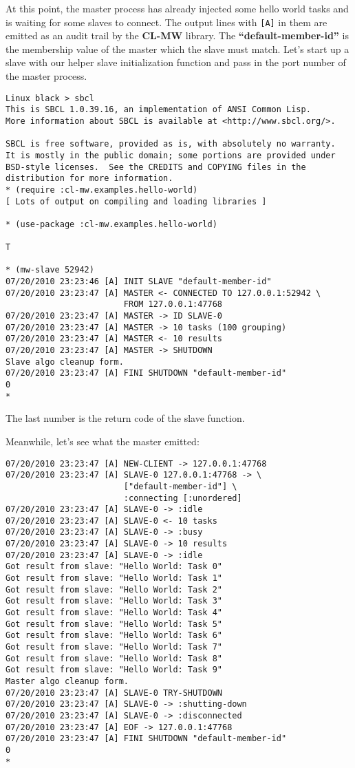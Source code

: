 \documentclass[titlepage,12pt]{book}
\newcommand{\xsmall}{\latexhtml{\small}{}}
\newcommand{\xnormalsize}{\latexhtml{\normalsize}{}}
\newcommand{\clmw}{\xsmall\textbf{CL-MW}\xnormalsize\xspace}
\newcommand{\bold}[1]{\textbf{#1}\xspace}
\begin{document}
At this point, the master process has already injected some hello
world tasks and is waiting for some slaves to connect. The output
lines with \texttt{[A]} in them are emitted as an audit trail by the
\clmw library.  The \bold{``default-member-id''} is the membership
value of the master which the slave must match. Let's start up a slave
with our helper slave initialization function and pass in the port
number of the master process.

\small
\begin{verbatim}
Linux black > sbcl
This is SBCL 1.0.39.16, an implementation of ANSI Common Lisp.
More information about SBCL is available at <http://www.sbcl.org/>.

SBCL is free software, provided as is, with absolutely no warranty.
It is mostly in the public domain; some portions are provided under
BSD-style licenses.  See the CREDITS and COPYING files in the
distribution for more information.
* (require :cl-mw.examples.hello-world)
[ Lots of output on compiling and loading libraries ]

* (use-package :cl-mw.examples.hello-world)

T

* (mw-slave 52942)
07/20/2010 23:23:46 [A] INIT SLAVE "default-member-id"
07/20/2010 23:23:47 [A] MASTER <- CONNECTED TO 127.0.0.1:52942 \
                        FROM 127.0.0.1:47768
07/20/2010 23:23:47 [A] MASTER -> ID SLAVE-0
07/20/2010 23:23:47 [A] MASTER -> 10 tasks (100 grouping)
07/20/2010 23:23:47 [A] MASTER <- 10 results
07/20/2010 23:23:47 [A] MASTER -> SHUTDOWN
Slave algo cleanup form.
07/20/2010 23:23:47 [A] FINI SHUTDOWN "default-member-id"
0
* 
\end{verbatim}
\normalsize

The last number is the return code of the slave function.

Meanwhile, let's see what the master emitted:

\small
\begin{verbatim}
07/20/2010 23:23:47 [A] NEW-CLIENT -> 127.0.0.1:47768
07/20/2010 23:23:47 [A] SLAVE-0 127.0.0.1:47768 -> \
                        ["default-member-id"] \
                        :connecting [:unordered]
07/20/2010 23:23:47 [A] SLAVE-0 -> :idle
07/20/2010 23:23:47 [A] SLAVE-0 <- 10 tasks
07/20/2010 23:23:47 [A] SLAVE-0 -> :busy
07/20/2010 23:23:47 [A] SLAVE-0 -> 10 results
07/20/2010 23:23:47 [A] SLAVE-0 -> :idle
Got result from slave: "Hello World: Task 0"
Got result from slave: "Hello World: Task 1"
Got result from slave: "Hello World: Task 2"
Got result from slave: "Hello World: Task 3"
Got result from slave: "Hello World: Task 4"
Got result from slave: "Hello World: Task 5"
Got result from slave: "Hello World: Task 6"
Got result from slave: "Hello World: Task 7"
Got result from slave: "Hello World: Task 8"
Got result from slave: "Hello World: Task 9"
Master algo cleanup form.
07/20/2010 23:23:47 [A] SLAVE-0 TRY-SHUTDOWN
07/20/2010 23:23:47 [A] SLAVE-0 -> :shutting-down
07/20/2010 23:23:47 [A] SLAVE-0 -> :disconnected
07/20/2010 23:23:47 [A] EOF -> 127.0.0.1:47768
07/20/2010 23:23:47 [A] FINI SHUTDOWN "default-member-id"
0
*
\end{verbatim}
\normalsize
\end{document}
